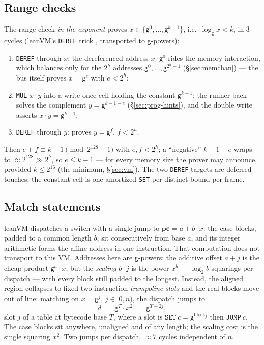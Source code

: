\documentclass[11pt]{article}
\newcommand{\gen}{\mathsf{g}}
\newcommand{\pc}{\mathbf{pc}}
\begin{document}
\subsection{Range checks}\label{sec:prog-range-checks}

The range check \emph{in the exponent} proves $x\in\{\gen^{0},\dots,\gen^{k-1}\}$, i.e.\ $\log_{\gen}x<k$, in 3 cycles (leanVM's \texttt{DEREF} trick \cite{leanvm-doc}, transported to $\gen$-powers):
\begin{enumerate}
\item \texttt{DEREF} through $x$: the dereferenced address $x\cdot\gen^{0}$ rides the memory interaction, which balances only for the $2^{h}$ addresses $\gen^{0},\dots,\gen^{2^{h}-1}$ (\S\ref{sec:memchan}) — the bus itself proves $x=\gen^{e}$ with $e<2^{h}$;
\item \texttt{MUL} $x\cdot y$ into a write-once cell holding the constant $\gen^{k-1}$: the runner back-solves the complement $y=\gen^{k-1-e}$ (\S\ref{sec:prog-hints}), and the double write asserts $x\cdot y=\gen^{k-1}$;
\item \texttt{DEREF} through $y$: proves $y=\gen^{f}$, $f<2^{h}$.
\end{enumerate}
Then $e+f\equiv k-1\pmod{2^{128}-1}$ with $e,f<2^{h}$; a ``negative'' $k-1-e$ wraps to $\approx2^{128}\gg2^{h}$, so $e\le k-1$ — for every memory size the prover may announce, provided $k\le2^{16}$ (the minimum, \S\ref{sec:vm}). The two \texttt{DEREF} targets are deferred touches; the constant cell is one amortized \texttt{SET} per distinct bound per frame.

\subsection{Match statements}\label{sec:prog-match}

leanVM dispatches a switch with a single jump to $\pc=a+b\cdot x$: the case blocks, padded to a common length $b$, sit consecutively from base $a$, and its integer arithmetic forms the affine address in one instruction. That computation does not transport to this VM. Addresses here are $\gen$-powers: the additive offset $a+j$ is the cheap product $\gen^{a}\cdot x$, but the \emph{scaling} $b\cdot j$ is the power $x^{b}$ — $\log_2 b$ squarings per dispatch — with every block still padded to the longest. Instead, the aligned region collapses to fixed two-instruction \emph{trampoline slots} and the real blocks move out of line: matching on $x=\gen^{j}$, $j\in[0,n)$, the dispatch jumps to
\[
  d \;=\; \gen^{T}\cdot x^{2} \;=\; \gen^{T+2j},
\]
slot $j$ of a table at bytecode base $T$, where a slot is $\texttt{SET}\ c=\gen^{\mathrm{block}_j}$ then $\texttt{JUMP}\ c$. The case blocks sit anywhere, unaligned and of any length; the scaling cost is the single squaring $x^{2}$. Two jumps per dispatch, $\approx7$ cycles independent of $n$.
\end{document}
